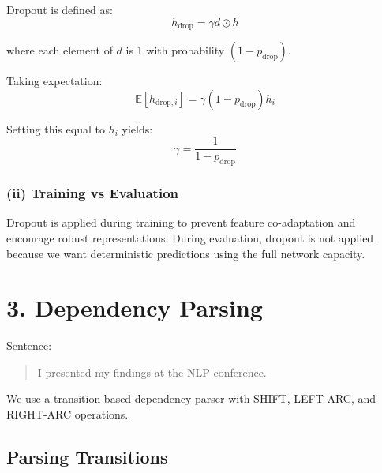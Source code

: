 \documentclass[11pt]{article}
\begin{document}
Dropout is defined as:
\[
h_{\text{drop}} = \gamma d \odot h
\]

where each element of $d$ is 1 with probability $(1 - p_{\text{drop}})$.

Taking expectation:
\[
\mathbb{E}[h_{\text{drop},i}] = \gamma (1 - p_{\text{drop}}) h_i
\]

Setting this equal to $h_i$ yields:
\[
\gamma = \frac{1}{1 - p_{\text{drop}}}
\]

\subsubsection*{(ii) Training vs Evaluation}

Dropout is applied during training to prevent feature co-adaptation and encourage robust representations.  
During evaluation, dropout is not applied because we want deterministic predictions using the full network capacity.

\section*{3. Dependency Parsing}

Sentence:
\begin{quote}
I presented my findings at the NLP conference.
\end{quote}

We use a transition-based dependency parser with SHIFT, LEFT-ARC, and RIGHT-ARC operations.

\subsection*{Parsing Transitions}
\end{document}
